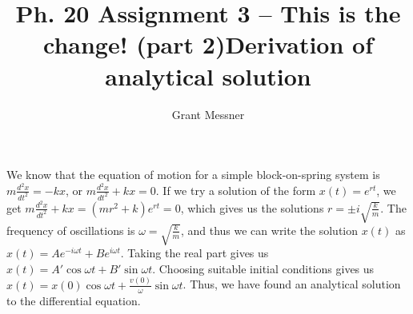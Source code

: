 \documentclass[11pt, oneside]{article}   	%
\title{Ph. 20 Assignment 3 -- This is the change! (part 2)}
\author{Grant Messner}
\begin{document}
\maketitle

\begin{section}
\title{\textbf{Derivation of analytical solution}}
\maketitle 

We know that the equation of motion for a simple block-on-spring system is $m\frac{d^2x}{dt^2} = -kx$, or $m\frac{d^2x}{dt^2} + kx = 0$. If we try a solution of the form $x(t) = e^{rt}$, we get $m\frac{d^2x}{dt^2} + kx = (mr^2 + k)e^{rt}= 0$, which gives us the solutions $r = \pm i\sqrt{\frac{k}{m}}$. The frequency of oscillations is $\omega=\sqrt{\frac{k}{m}}$, and thus we can write the solution $x(t)$ as $x(t) = Ae^{-i\omega t} + Be^{i\omega t}$. Taking the real part gives us $x(t) = A'\cos{\omega t} + B'\sin{\omega t}$. Choosing suitable initial conditions gives us $x(t) = x(0)\cos{\omega t} + \frac{v(0)}{\omega}\sin{\omega t}$. Thus, we have found an analytical solution to the differential equation.

\end{section}
\end{document}
